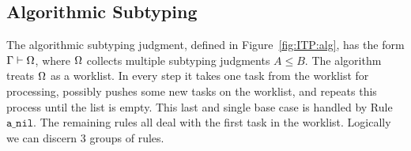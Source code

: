 \subsection{Algorithmic Subtyping}

The algorithmic subtyping judgment, defined in Figure~\ref{fig:ITP:alg}, has the form $\Gamma\vdash\Omega$, where
$\Omega$ collects multiple subtyping judgments $A\le B$. 
The algorithm treats $\Omega$ as a worklist. In every step
it takes one task from the worklist for processing, possibly
pushes some new tasks on the worklist, and repeats this
process until the list is empty. This last and single base case
is handled by Rule~$\mathtt{a\_nil}$.
The remaining rules all deal with the first task in the worklist.
Logically we can discern 3 groups of rules.

